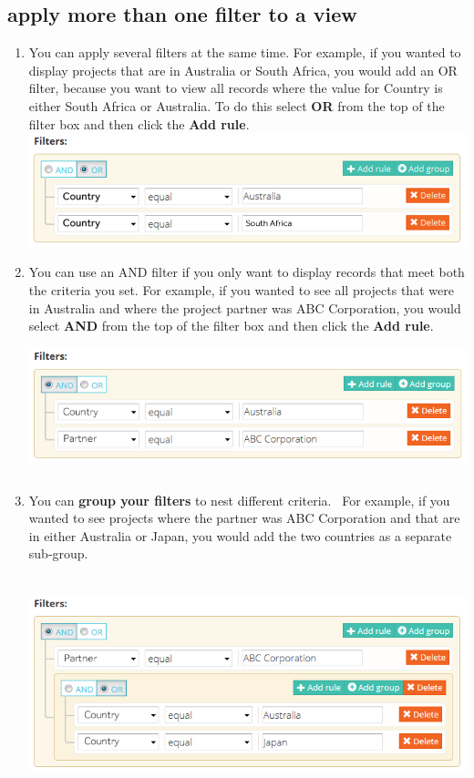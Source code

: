 \documentclass{ctrlo-int-toc}
\begin{document}
\subsection[apply more than one filter to a view]{apply more than one filter to a view}
\begin{enumerate}
\item You can apply several filters at the same time. For example, if you wanted to display projects that are in Australia or South Africa, you would add an OR filter, because you want to view all records where the value for Country is either South Africa or Australia. To do this select \textbf{OR} from the top of the filter box and then click the \textbf{Add rule}.\newline
\includegraphics{userguide-img/userguide-img003.png}
 

\item You can use an AND filter if you only want to display records that meet both the criteria you set. For example, if you wanted to see all projects that were in Australia and where the project partner was ABC Corporation, you would select \textbf{AND} from the top of the filter box and then click the \textbf{Add rule}.\newline
\includegraphics[width=15.667cm,height=4.055cm]{userguide-img/userguide-img004.png}
 

\item You can \textbf{group your filters} to nest different criteria. \ For example, if you wanted to see projects where the partner was ABC Corporation and that are in either Australia or Japan, you would add the two countries as a separate sub-group.

\includegraphics[width=15.693cm,height=6.272cm]{userguide-img/userguide-img005.png}
 


\end{enumerate}
\end{document}
